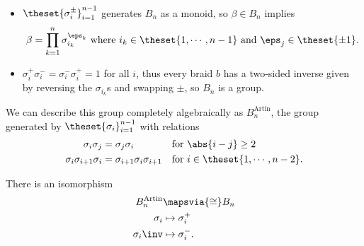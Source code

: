 \begin{remark}

\hfill

\begin{itemize}
\item
  \(\theset{\sigma_i^\pm}_{i=1}^{n-1}\) generates \(B_n\) as a monoid,
  so \(\beta \in B_n\) implies
  \begin{align*}
  \beta = \prod_{k=1}^n \sigma_{i_k}^{\eps_k} \text{ where } i_k \in \theset{1, \cdots, n-1} \text{ and }\eps_j \in \theset{\pm 1}
  .\end{align*}
\item
  \(\sigma_i^+ \sigma_i^- = \sigma_i^- \sigma_i^+ = 1\) for all \(i\),
  thus every braid \(b\) has a two-sided inverse given by reversing the
  \(\sigma_{i_k}\)s and swapping \(\pm\), so \(B_n\) is a group.
\end{itemize}

We can describe this group completely algebraically as
\(B_n^{\text{Artin}}\), the group generated by
\(\theset{\sigma_i}_{i=1}^{n-1}\) with relations
\begin{align*}  
\sigma_i \sigma_j &= \sigma_j \sigma_i && \text{for } \abs{i-j} \geq 2 \\ 
\sigma_i \sigma_{i+1} \sigma_i &= \sigma_{i+1} \sigma_i \sigma_{i+1} &&  \text{for } i\in \theset{1, \cdots, n-2}
.\end{align*}

\end{remark}

\begin{proposition}[?]

There is an isomorphism
\begin{align*}
B_n^{\text{Artin}} &\mapsvia{\cong} B_n \\
\sigma_i &\mapsto \sigma_i^+ \\
\sigma_i\inv &\mapsto \sigma_i^-
.\end{align*}

\end{proposition}


